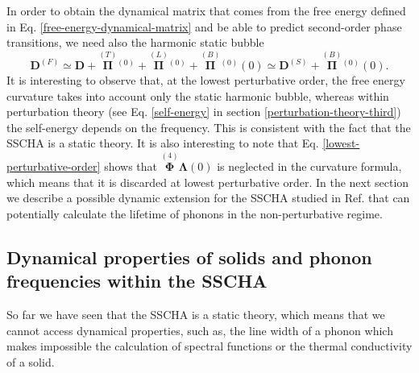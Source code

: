 In order to obtain the dynamical matrix that comes from the free energy defined in Eq. \ref{free-energy-dynamical-matrix} and be able to predict second-order phase transitions, we need also the harmonic static bubble
\begin{equation}
 \label{lowest-perturbative-order}
 \mathbf{D}^{(F)}\simeq\mathbf{D}+\overset{(T)}{\boldsymbol{\Pi}}{}^{(0)}+\overset{(L)}{\boldsymbol{\Pi}}{}^{(0)}+\overset{(B)}{\boldsymbol{\Pi}}{}^{(0)}(0)\simeq\mathbf{D}^{(S)}+\overset{(B)}{\boldsymbol{\Pi}}{}^{(0)}(0).
\end{equation}  
It is interesting to observe that, at the lowest perturbative order, the free energy curvature takes into account only the static harmonic bubble, whereas within perturbation theory (see Eq. \ref{self-energy} 
in section \ref{perturbation-theory-third}) the self-energy depends on the frequency. This is consistent with the fact that the SSCHA is a static theory. It is also interesting to note 
that Eq. \ref{lowest-perturbative-order} shows that $\overset{(4)}{\boldsymbol{\Phi}}\boldsymbol{\Lambda}(0)$ is neglected in the curvature formula, which means that it is discarded at lowest perturbative order. 
In the next section we describe a possible dynamic extension for the SSCHA studied in Ref. \cite{bianco2017second} that can potentially calculate the lifetime of phonons in the non-perturbative regime.
 
\subsection{Dynamical properties of solids and phonon frequencies within the SSCHA}
\label{dynamical-sscha}

So far we have seen that the SSCHA is a static theory, which means that we cannot access dynamical properties, such as, the line width of a phonon which makes impossible the calculation of spectral functions or 
the thermal conductivity of a solid. \\

